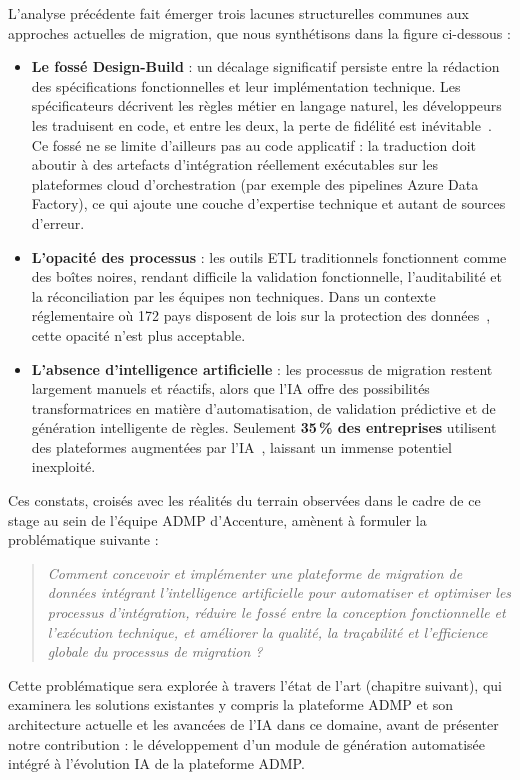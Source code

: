 L'analyse précédente fait émerger trois lacunes structurelles communes aux
approches actuelles de migration, que nous synthétisons dans la figure
ci-dessous :

\begin{itemize}
 \item \textbf{Le fossé Design-Build} : un décalage significatif persiste
entre la rédaction des spécifications fonctionnelles et leur implémentation
technique. Les spécificateurs décrivent les règles métier en langage naturel,
les développeurs les traduisent en code, et entre les deux, la perte de
fidélité est inévitable~\cite{admp_overview}. Ce fossé ne se limite d'ailleurs
pas au code applicatif : la traduction doit aboutir à des artefacts
d'intégration réellement exécutables sur les plateformes cloud d'orchestration
(par exemple des pipelines Azure Data Factory), ce qui ajoute une couche
d'expertise technique et autant de sources d'erreur.

    \item \textbf{L'opacité des processus} : les outils ETL traditionnels
    fonctionnent comme des boîtes noires, rendant difficile la validation
    fonctionnelle, l'auditabilité et la réconciliation par les équipes non
    techniques. Dans un contexte réglementaire où 172 pays disposent de lois
    sur la protection des données~\cite{stationx_privacy}, cette opacité
    n'est plus acceptable.

    \item \textbf{L'absence d'intelligence artificielle} : les processus de
    migration restent largement manuels et réactifs, alors que l'IA offre
    des possibilités transformatrices en matière d'automatisation, de
    validation prédictive et de génération intelligente de règles.
    Seulement \textbf{35\,\% des entreprises} utilisent des plateformes
    augmentées par l'IA~\cite{reanin2025}, laissant un immense potentiel
    inexploité.
\end{itemize}

Ces constats, croisés avec les réalités du terrain observées dans le cadre
de ce stage au sein de l'équipe ADMP d'Accenture, amènent à formuler la
problématique suivante :

\begin{quote}
\textit{Comment concevoir et implémenter une plateforme de migration de
données intégrant l'intelligence artificielle pour automatiser et optimiser
les processus d'intégration, réduire le fossé entre la conception
fonctionnelle et l'exécution technique, et améliorer la qualité, la
traçabilité et l'efficience globale du processus de migration ?}
\end{quote}

Cette problématique sera explorée à travers l'état de l'art (chapitre
suivant), qui examinera les solutions existantes  y compris la plateforme
ADMP et son architecture actuelle  et les avancées de l'IA dans ce
domaine, avant de présenter notre contribution : le développement d'un
module de génération automatisée intégré à l'évolution IA de la plateforme
ADMP.
